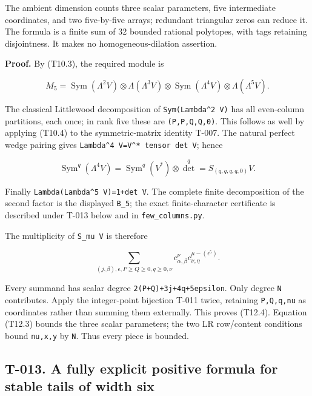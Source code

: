 \documentclass[
  10pt,
]{article}
\begin{document}
The ambient dimension counts three scalar parameters, five intermediate
coordinates, and two five-by-five arrays; redundant triangular zeros can
reduce it. The formula is a finite sum of 32 bounded rational polytopes,
with tags retaining disjointness. It makes no homogeneous-dilation
assertion.

\textbf{Proof.} By (T10.3), the required module is

\[
M_5=\operatorname{Sym}(\Lambda^2V)\otimes\Lambda(\Lambda^3V)
\otimes\operatorname{Sym}(\Lambda^4V)\otimes\Lambda(\Lambda^5V).
\]

The classical Littlewood decomposition of
\texttt{\small Sym(\allowbreak{}Lambda\textasciicircum{}2 V)\allowbreak{}}
has all even-column partitions, each once; in rank five these are
\texttt{\small (\allowbreak{}P,\allowbreak{}P,\allowbreak{}Q,\allowbreak{}Q,\allowbreak{}0)\allowbreak{}}.
This follows as well by applying (T10.4) to the symmetric-matrix
identity T-007. The natural perfect wedge pairing gives
\texttt{\small Lambda\textasciicircum{}4 V=\allowbreak{}V\textasciicircum{}* tensor det V};
hence

\[
\operatorname{Sym}^q(\Lambda^4V)
=\operatorname{Sym}^q(V^*)\otimes\det^q
=S_{(q,q,q,q,0)}V.
\]

Finally
\texttt{\small Lambda(\allowbreak{}Lambda\textasciicircum{}5 V)\allowbreak{}=\allowbreak{}1+\allowbreak{}det V}.
The complete finite decomposition of the second factor is the displayed
\texttt{\small B\_\allowbreak{}5}; the exact finite-character
certificate is described under T-013 below and in
\texttt{\small few\_\allowbreak{}columns.py}.

The multiplicity of \texttt{\small S\_\allowbreak{}mu V} is therefore

\[
\sum_{(j,\beta),\epsilon,P\ge Q\ge0,q\ge0,\nu}
c_{\alpha,\beta}^{\nu}c_{\nu,\eta}^{\mu-(\epsilon^5)}.
\]

Every summand has scalar degree
\texttt{\small 2(\allowbreak{}P+\allowbreak{}Q)\allowbreak{}+\allowbreak{}3j+\allowbreak{}4q+\allowbreak{}5epsilon}.
Only degree \texttt{\small N} contributes. Apply the integer-point
bijection T-011 twice, retaining
\texttt{\small P,\allowbreak{}Q,\allowbreak{}q,\allowbreak{}nu} as
coordinates rather than summing them externally. This proves (T12.4).
Equation (T12.3) bounds the three scalar parameters; the two LR
row/content conditions bound
\texttt{\small nu,\allowbreak{}x,\allowbreak{}y} by \texttt{\small N}.
Thus every piece is bounded.

\subsection{T-013. A fully explicit positive formula for stable tails of
width
six}\label{t-013.-a-fully-explicit-positive-formula-for-stable-tails-of-width-six}
\end{document}
